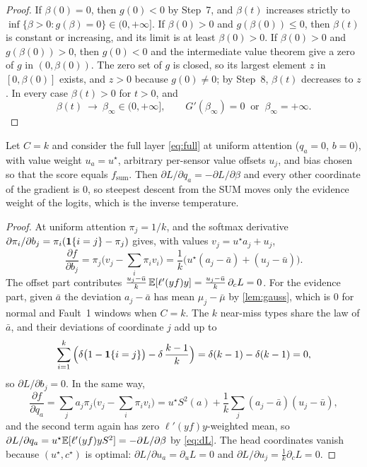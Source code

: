 \begin{proof}
 If $\beta(0)=0$, then $g(0)<0$ by Step~7, and $\beta(t)$ increases strictly to $\inf\{\beta>0:g(\beta)=0\}\in(0,+\infty]$. If $\beta(0)>0$ and $g(\beta(0))\le0$, then $\beta(t)$ is constant or increasing, and its limit is at least $\beta(0)>0$. If $\beta(0)>0$ and $g(\beta(0))>0$, then $g(0)<0$ and the intermediate value theorem give a zero of $g$ in $(0,\beta(0))$. The zero set of $g$ is closed, so its largest element $z$ in $[0,\beta(0)]$ exists, and $z>0$ because $g(0)\neq0$; by Step~8, $\beta(t)$ decreases to $z$. In every case $\beta(t)>0$ for $t>0$, and
\begin{equation}\label{eq:noOR}
  \boxed{\;\beta(t)\ \longrightarrow\ \beta_\infty\in(0,+\infty],\qquad G'(\beta_\infty)=0\ \text{ or }\ \beta_\infty=+\infty .\;}
\end{equation}
\end{proof}

\begin{remark}\label{rem:full}
Let $C=k$ and consider the full layer \cref{eq:full} at uniform attention ($q_a=0$, $b=0$), with value weight $u_a=u^\star$, arbitrary per-sensor value offsets $u_j$, and bias chosen so that the score equals $f_{\mathrm{sum}}$. Then $\partial L/\partial q_a=-\partial L/\partial\beta$ and every other coordinate of the gradient is $0$, so steepest descent from the SUM moves only the evidence weight of the logits, which is the inverse temperature.
\end{remark}

\begin{proof}
At uniform attention $\pi_j=1/k$, and the softmax derivative $\partial\pi_i/\partial b_j=\pi_i(\mathbf{1}\{i=j\}-\pi_j)$ gives, with values $v_j=u^\star a_j+u_j$,
\begin{equation}\label{eq:dfdb}
  \frac{\partial f}{\partial b_j}=\pi_j\Big(v_j-\sum_i\pi_iv_i\Big)=\frac1k\Big(u^\star(a_j-\bar a)+(u_j-\bar u)\Big).
\end{equation}
The offset part contributes $\frac{u_j-\bar u}{k}\,\mathbb{E}[\ell'(yf)y]=\frac{u_j-\bar u}{k}\,\partial_cL=0$. For the evidence part, given $\bar a$ the deviation $a_j-\bar a$ has mean $\mu_j-\bar\mu$ by \cref{lem:gauss}, which is $0$ for normal and Fault~1 windows when $C=k$. The $k$ near-miss types share the law of $\bar a$, and their deviations of coordinate $j$ add up to
\begin{equation}\label{eq:nm-sum}
  \sum_{i=1}^k\Big(\delta\big(1-\mathbf{1}\{i=j\}\big)-\delta\,\frac{k-1}{k}\Big)=\delta(k-1)-\delta(k-1)=0 ,
\end{equation}
so $\partial L/\partial b_j=0$. In the same way,
\begin{equation}\label{eq:dfdq}
  \frac{\partial f}{\partial q_a}=\sum_ja_j\pi_j\Big(v_j-\sum_i\pi_iv_i\Big)=u^\star S^2(a)+\frac1k\sum_j(a_j-\bar a)(u_j-\bar u),
\end{equation}
and the second term again has zero $\ell'(yf)y$-weighted mean, so $\partial L/\partial q_a=u^\star\mathbb{E}[\ell'(yf)yS^2]=-\partial L/\partial\beta$ by \cref{eq:dL}. The head coordinates vanish because $(u^\star,c^\star)$ is optimal: $\partial L/\partial u_a=\partial_uL=0$ and $\partial L/\partial u_j=\frac1k\partial_cL=0$.
\end{proof}

